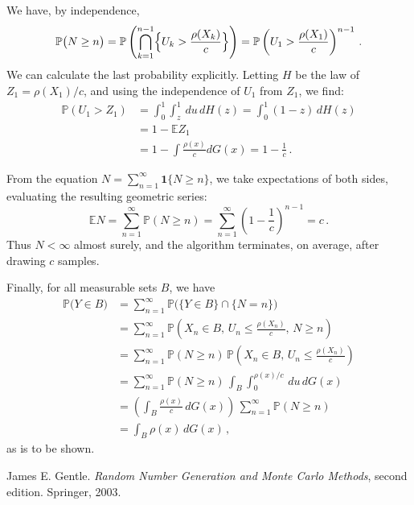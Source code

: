 \documentclass[12pt]{article}
\newcommand{\PP}{\mathbb{P}}
\newcommand{\E}{\mathbb{E}}
\begin{document}
We have, by independence,
\[
\PP\bigl( N \geq n \bigr) = 
\PP \left( \bigcap_{k=1}^{n-1} \Bigl\{ U_k > \frac{\rho(X_k)}{c} \Bigr\} \right)
=
\PP \left( U_1 > \frac{\rho(X_1)}{c} \right)^{n-1}\,.
\]
We can calculate the last probability explicitly.
Letting $H$ be the law of $Z_1 = \rho(X_1)/c$,
and using the independence of $U_1$ from $Z_1$, we find:
\begin{align*}
\PP \left( U_1 > Z_1 \right)
&= 
\int_0^1 \int_z^1 \, du \, dH(z)
= 
\int_0^1 (1-z) \, dH(z) \\
&= 1-\E Z_1 \\
&= 1-\int \frac{\rho(x)}{c} dG(x)
= 1 - \frac{1}{c}\,.
\end{align*}

From the equation $N = \sum_{n=1}^\infty \mathbf{1} \{ N \geq n \}$,
we take expectations of both sides, evaluating
the resulting geometric series:
\[
\E N = \sum_{n=1}^\infty \PP ( N \geq n ) = \sum_{n=1}^\infty
\left( 1 - \frac1c \right)^{n-1} = c\,.
\]
Thus $N < \infty$ almost surely, 
and the algorithm terminates, on average, after drawing $c$ samples.

Finally, for all measurable sets $B$,
we have
\begin{align*}
\PP\bigl( Y \in B \bigr)
&= \sum_{n=1}^\infty \PP\bigl( \{ Y \in B \} \cap \{ N = n \} \bigr)
\\
&= \sum_{n=1}^\infty \PP \left( X_n \in B,\, U_n \leq \frac{\rho(X_n)}{c},\, N \geq n \right) \\
&= \sum_{n=1}^\infty \PP(N \geq n) \, \PP \left( X_n \in B,\, U_n \leq \frac{\rho(X_n)}{c} \right) \\
&= \sum_{n=1}^\infty \PP(N \geq n) \,  \int_{B} 
\int_{0}^{\rho(x)/c} \,
du \, dG(x) \\
&= \left( \int_{B} \frac{\rho(x)}{c} \, dG(x) \right) \,
\sum_{n=1}^\infty \PP(N \geq n) \\
&= \int_B \rho(x) \, dG(x) \,,
\end{align*}
as is to be shown.

\begin{thebibliography}{6}
James E. Gentle. \emph{Random Number Generation and Monte Carlo Methods},
second edition.  Springer, 2003. 
\end{thebibliography}

\end{document}
